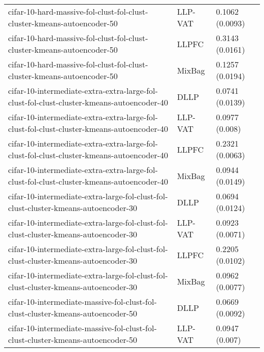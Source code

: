 \begin{longtable}{lll}
                                      cifar-10-hard-massive-fol-clust-fol-clust-cluster-kmeans-autoencoder-50 &   LLP-VAT &                       0.1062 (0.0093) \\
                                      cifar-10-hard-massive-fol-clust-fol-clust-cluster-kmeans-autoencoder-50 &     LLPFC &                       0.3143 (0.0161) \\
                                      cifar-10-hard-massive-fol-clust-fol-clust-cluster-kmeans-autoencoder-50 &    MixBag &                       0.1257 (0.0194) \\
                    cifar-10-intermediate-extra-extra-large-fol-clust-fol-clust-cluster-kmeans-autoencoder-40 &      DLLP &                       0.0741 (0.0139) \\
                    cifar-10-intermediate-extra-extra-large-fol-clust-fol-clust-cluster-kmeans-autoencoder-40 &   LLP-VAT &                        0.0977 (0.008) \\
                    cifar-10-intermediate-extra-extra-large-fol-clust-fol-clust-cluster-kmeans-autoencoder-40 &     LLPFC &                       0.2321 (0.0063) \\
                    cifar-10-intermediate-extra-extra-large-fol-clust-fol-clust-cluster-kmeans-autoencoder-40 &    MixBag &                       0.0944 (0.0149) \\
                          cifar-10-intermediate-extra-large-fol-clust-fol-clust-cluster-kmeans-autoencoder-30 &      DLLP &                       0.0694 (0.0124) \\
                          cifar-10-intermediate-extra-large-fol-clust-fol-clust-cluster-kmeans-autoencoder-30 &   LLP-VAT &                       0.0923 (0.0071) \\
                          cifar-10-intermediate-extra-large-fol-clust-fol-clust-cluster-kmeans-autoencoder-30 &     LLPFC &                       0.2205 (0.0102) \\
                          cifar-10-intermediate-extra-large-fol-clust-fol-clust-cluster-kmeans-autoencoder-30 &    MixBag &                       0.0962 (0.0077) \\
                              cifar-10-intermediate-massive-fol-clust-fol-clust-cluster-kmeans-autoencoder-50 &      DLLP &                       0.0669 (0.0092) \\
                              cifar-10-intermediate-massive-fol-clust-fol-clust-cluster-kmeans-autoencoder-50 &   LLP-VAT &                        0.0947 (0.007) \\

\end{longtable}
